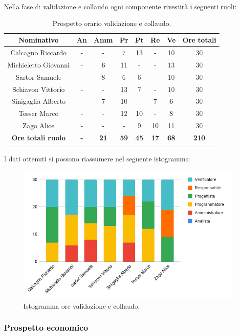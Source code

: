 Nella fase di validazione e collaudo ogni componente rivestirà i seguenti ruoli:
\begin{longtable}{|c|c|c|c|c|c|c|c|}
	\hline
	\rowcolor[HTML]{F9CB9C} 
	\textbf{Nominativo} & \textbf{An} & \textbf{Amm} & \textbf{Pr} & \textbf{Pt} & \textbf{Re} & \textbf{Ve} & \textbf{Ore totali} \\
	\hline
	Calcagno Riccardo &
	- &
	- &
	7 &
	13 &
	- &
	10 &
	30 \\
	\hline
	Michieletto Giovanni &
	- &
	6 &
	11 &
	- &
	- &
	13 &
	30 \\
	\hline
	Sartor Samuele  &
	- &
	8 &
	6 &
	6 &
	- &
	10 &
	30 \\
	\hline
	Schiavon Vittorio  &
	- &
	- &
	13 &
	7 &
	- &
	10 &
	30 \\
	\hline
	Sinigaglia Alberto  &
	- &
	7 &
	10 &
	- &
	7 &
	6 &
	30 \\
	\hline
	Tesser Marco &
	- &
	- &
	12 &
	10 &
	- &
	8 &
	30 \\
	\hline
	Zago Alice &
	- &
	- &
	- &
	9 &
	10 &
	11 &
	30 \\
	\hline	
	\rowcolor[HTML]{F9CB9C} 
	\textbf{Ore totali ruolo} & \textbf{-} & \textbf{21} & \textbf{59} & \textbf{45} & \textbf{17} & \textbf{68} & \textbf{210} \\
	\hline
	\caption{Prospetto orario validazione e collaudo.}
	\label{fig: Prospetto orario validazione e collaudo.}
\end{longtable}

I dati ottenuti si possono riassumere nel seguente istogramma:
\begin{figure}[H]
	\centering
	\includegraphics[width=0.8\linewidth]{./res/images/OreValidazioneCollaudo.png}
	\caption{Istogramma ore validazione e collaudo.}
	\label{fig: Istogramma ore validazione e collaudo.}
\end{figure}

\subsubsection{Prospetto economico}


